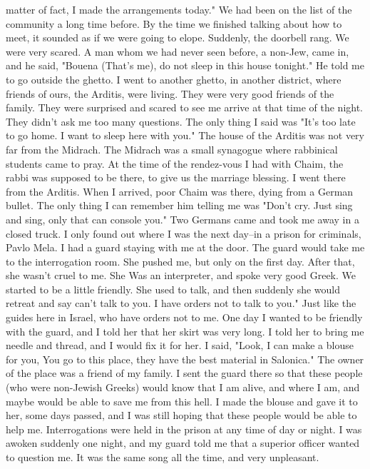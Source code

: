 matter of fact, I made the arrangements today." We had been on the list 
of the community a long time before. By the time we finished talking 
about how to meet, it sounded as if we were going to elope. 
Suddenly, the doorbell rang. We were very scared. A man whom we 
had never seen before, a non-Jew, came in, and he said, "Bouena (That's 
me), do not sleep in this house tonight." He told me to go outside the 
ghetto. I went to another ghetto, in another district, where friends 
of ours, the Arditis, were living. They were very good friends of the 
family. They were surprised and scared to see me arrive at that time of 
the night. They didn't ask me too many questions. The only thing 
I said was "It's too late to go home. I want to sleep here 
with you." 
The house of the Arditis was not very far from the Midrach. The 
Midrach was a small synagogue where rabbinical students came to pray. 
At the time of the rendez-vous I had with Chaim, the rabbi was supposed 
to be there, to give us the marriage blessing. I went there from the 
Arditis. When I arrived, poor Chaim was there, dying from a German bullet. 
The only thing I can remember him telling me was "Don't cry. Just 
sing and sing, only that can console you." Two Germans came and took me 
away in a closed truck. I only found out where I was the next day--in 
a prison for criminals, Pavlo Mela. I had a guard staying with me at 
the door. The guard would take me to the interrogation room. She pushed 
me, but only on the first day. After that, she wasn't cruel to me. She 
Was an interpreter, and spoke very good Greek. We started to be a little 
friendly. She used to talk, and then suddenly she would retreat and say
can't talk to you. I have orders not to talk to you." Just like the guides here 
in Israel, who have orders not to me. 
One day I wanted to be friendly with the guard, and I told her that 
her skirt was very long. I told her to bring me needle and thread, and 
I would fix it for her. I said, "Look, I can make a blouse for you, 
You go to this place, they have the best material in Salonica." The owner 
of the place was a friend of my family. I sent the guard there so 
that these people (who were non-Jewish Greeks) would know that I am alive, 
and where I am, and maybe would be able to save me from this hell. 
I made the blouse and gave it to her, some days passed, and I was 
still hoping that these people would be able to help me. Interrogations 
were held in the prison at any time of day or night. I was awoken 
suddenly one night, and my guard told me that a superior officer wanted 
to question me. It was the same song all the time, and very unpleasant. 
